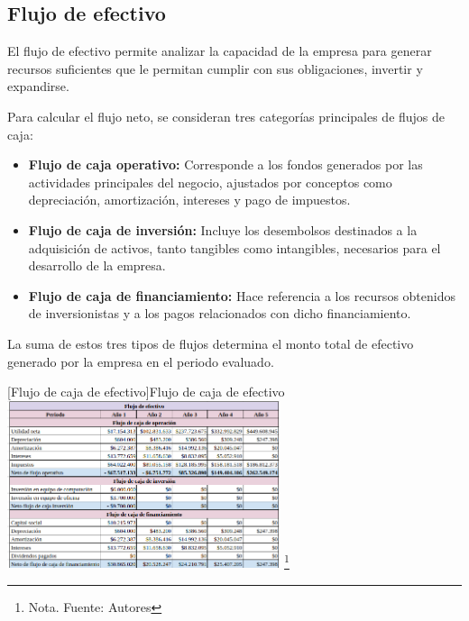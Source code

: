\subsection{Flujo de efectivo}

El flujo de efectivo permite analizar la capacidad de la empresa para generar recursos suficientes que le permitan cumplir con sus obligaciones, invertir y expandirse.

Para calcular el flujo neto, se consideran tres categorías principales de flujos de caja:

\begin{itemize}
    \item \textbf{Flujo de caja operativo:} Corresponde a los fondos generados por las actividades principales del negocio, ajustados por conceptos como depreciación, amortización, intereses y pago de impuestos.
    \item \textbf{Flujo de caja de inversión:} Incluye los desembolsos destinados a la adquisición de activos, tanto tangibles como intangibles, necesarios para el desarrollo de la empresa.
    \item \textbf{Flujo de caja de financiamiento:} Hace referencia a los recursos obtenidos de inversionistas y a los pagos relacionados con dicho financiamiento.
\end{itemize}

La suma de estos tres tipos de flujos determina el monto total de efectivo generado por la empresa en el periodo evaluado.

\vspace{2mm}
\begin{minipage}{0.8\textwidth}
\centering
{}[Flujo de caja de efectivo]{Flujo de caja de efectivo}
\label{flujoOperacional}
\includegraphics[width=0.6\textwidth]{Content/Images/AF/FlujoDeEfectivo.png}
\footnote{Nota. \textup{Fuente: Autores}}
\end{minipage}
